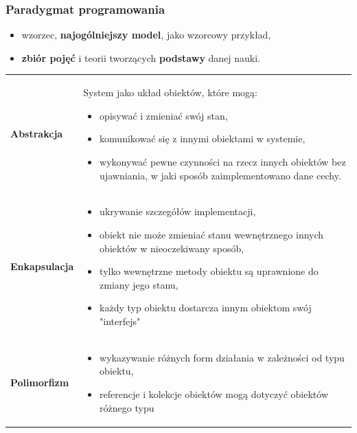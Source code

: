\documentclass[a4paper]{article}
\begin{document}
    \subsubsection{Paradygmat programowania}
    \begin{itemize}
        \item wzorzec, \textbf{najogólniejszy model}, jako wzorcowy przykład,
        \item \textbf{zbiór pojęć} i teorii tworzących \textbf{podstawy} danej nauki.
    \end{itemize}

    \begin{table}[H]
        \begin{center}
            \begin{tabular}{  p{3cm} p{12cm}  }
                \textbf{Abstrakcja} &
                System jako układ obiektów, które mogą:
                \begin{itemize}
                    \item opisywać i zmieniać swój stan,
                    \item komunikować się z innymi obiektami w systemie,
                    \item wykonywać pewne czynności na rzecz innych obiektów bez ujawniania, w jaki sposób zaimplementowano
                    dane cechy.
                \end{itemize}\\


                \textbf{Enkapsulacja}
                &
                \begin{itemize}
                    \item ukrywanie szczegółów implementacji,
                    \item obiekt nie może zmieniać stanu wewnętrznego innych obiektów w nieoczekiwany sposób,
                    \item tylko wewnętrzne metody obiektu są uprawnione do zmiany jego stanu,
                    \item każdy typ obiektu dostarcza innym obiektom swój "interfejs"
                \end{itemize}\\


                \textbf{Polimorfizm}
                &
                \begin{itemize}
                    \item wykazywanie różnych form działania w zależności od typu obiektu,
                    \item referencje i kolekcje obiektów mogą dotyczyć obiektów różnego typu
                \end{itemize}\\



\end{tabular}
\end{center}
\end{table}
\end{document}
